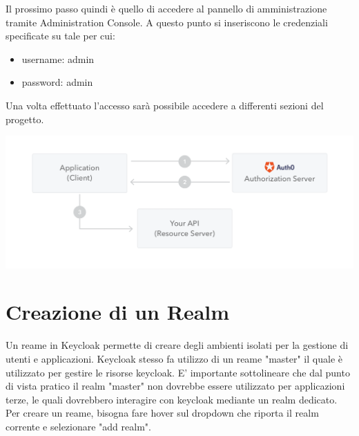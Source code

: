 \documentclass[twoside]{report}
\begin{document}
Il prossimo passo quindi è quello di accedere al pannello di amministrazione tramite Administration Console.
\bigbreak
A questo punto si inseriscono le credenziali specificate su tale per cui:

\begin{itemize}
	\item username: admin
	\item password: admin
\end{itemize}


Una volta effettuato l'accesso sarà possibile accedere a differenti sezioni del progetto.


\begin{center}
\begin{minipage}{0.7\linewidth}
    \vspace{2mm}
    \centering
    \includegraphics[width= \linewidth]{2.png}
    \vspace{2mm}
\end{minipage}
\end{center}
\newpage
\section{Creazione di un Realm}

Un reame in Keycloak permette di creare degli ambienti isolati per la gestione di utenti e applicazioni. Keycloak stesso fa utilizzo di un reame "master" il quale è utilizzato per gestire le risorse keycloak.
\bigbreak
E' importante sottolineare che dal punto di vista pratico il realm "master" non dovrebbe essere utilizzato per applicazioni terze, le quali dovrebbero interagire con keycloak mediante un realm dedicato.
\bigbreak
Per creare un reame, bisogna fare hover sul dropdown che riporta il realm corrente e selezionare "add realm".
\end{document}
